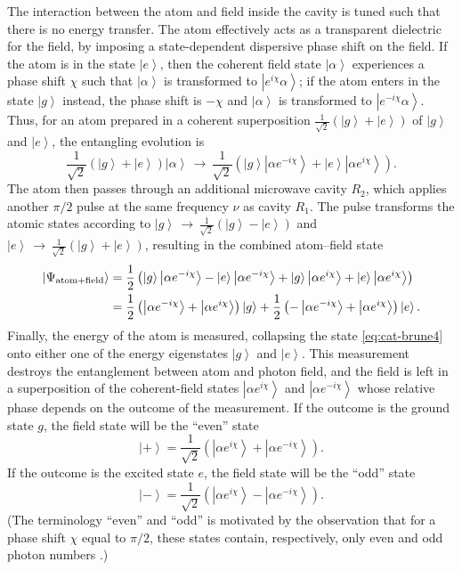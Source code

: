 \documentclass[3p,sort&compress,12pt]{elsarticle}
\newcommand{\ket}[1]{\left\vert{#1}\right\rangle}
\newcommand{\E}{\ensuremath{e}}
\newcommand{\I}{\ensuremath{i}}
\begin{document}
The interaction between the atom and field inside the cavity is tuned such that there is no energy transfer. The atom effectively acts as a transparent dielectric for the field, by imposing a state-dependent dispersive phase shift on the field. If the atom is in the state $\ket{e}$, then the coherent field state $\ket{\alpha}$ experiences a phase shift $\chi$ such that $\ket{\alpha}$ is transformed to $\ket{\E^{i\chi} \alpha}$; if the atom enters in the state $\ket{g}$ instead, the phase shift is $-\chi$ and $\ket{\alpha}$ is transformed to $\ket{\E^{-i\chi} \alpha}$. Thus, for an atom prepared in a coherent superposition $\frac{1}{\sqrt{2}}\left( \ket{g} + \ket{e} \right)$ of $\ket{g}$ and $\ket{e}$, the entangling evolution is
%
\begin{equation}\label{eq:cat-brune}
  \frac{1}{\sqrt{2}}\left( \ket{g} + \ket{e} \right)  \ket{\alpha} \,\longrightarrow\,
  \frac{1}{\sqrt{2}} \left( \ket{g} \ket{\alpha \E^{-\I \chi}} + \ket{e} \ket{\alpha
      \E^{\I \chi}} \right).
\end{equation}
%
The atom then passes through an additional microwave cavity $R_2$, which applies another $\pi/2$ pulse at the same frequency $\nu$ as cavity $R_1$. The pulse transforms the atomic states according to $\ket{g} \,\longrightarrow\,\frac{1}{\sqrt{2}} \left( \ket{g} - \ket{e} \right)$ and $\ket{e} \,\longrightarrow\, \frac{1}{\sqrt{2}} \left( \ket{g} + \ket{e} \right)$, resulting in the combined atom--field state
%
\begin{align}\label{eq:cat-brune4}
\ket{\Psi_\text{atom+field}} &=
\frac{1}{2} \left( \ket{g} \ket{\alpha \E^{-\I \chi}} - \ket{e} \ket{\alpha \E^{-\I \chi}} +
  \ket{g} \ket{\alpha \E^{\I \chi}} + \ket{e} \ket{\alpha \E^{\I \chi}} \right) \notag \\
&= \frac{1}{2} \left( \ket{\alpha \E^{-\I \chi}} + \ket{\alpha \E^{\I \chi}} \right) \ket{g} +
\frac{1}{2} \left(- \ket{\alpha \E^{-\I \chi}} + \ket{\alpha \E^{\I \chi}} \right) \ket{e}.
\end{align}
%
Finally, the energy of the atom is measured, collapsing the state \eqref{eq:cat-brune4} onto either one of the energy eigenstates $\ket{g}$ and $\ket{e}$. This measurement destroys the entanglement between atom and photon field, and the field is left in a superposition of the coherent-field states $\ket{\alpha \E^{\I \chi}}$ and $\ket{\alpha \E^{-\I \chi}}$ whose relative phase depends on the outcome of the measurement. If the outcome is the ground state $g$, the field state will be the ``even'' state
%
\begin{equation}\label{eq:cat-bhvlhvlrune}
\ket{+} = \frac{1}{\sqrt{2}} \left( \ket{\alpha \E^{\I \chi}} + \ket{\alpha \E^{-\I \chi}} \right).
\end{equation}
%
If the outcome is the excited state $e$, the field state will be the ``odd'' state
%
\begin{equation}\label{eq:cat-baahvlhvlrune}
\ket{-} = \frac{1}{\sqrt{2}} \left( \ket{\alpha \E^{\I \chi}} - \ket{\alpha \E^{-\I \chi}} \right).
\end{equation}
%
(The terminology ``even'' and ``odd'' is motivated by the observation that for a phase shift $\chi$ equal to $\pi/2$, these states contain, respectively, only even and odd photon numbers \cite{Deleglise:2008:oo}.) 
\end{document}
